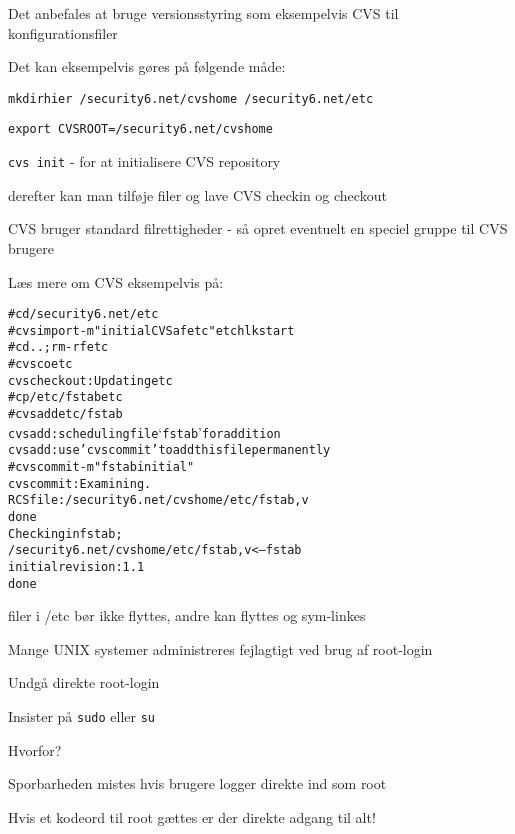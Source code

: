 
\begin{list1}
\item Det anbefales at bruge versionsstyring som eksempelvis CVS til
  konfigurationsfiler 
\item Det kan eksempelvis gøres på følgende måde:
\begin{list2}
\item \verb+mkdirhier /security6.net/cvshome /security6.net/etc+
\item \verb+export CVSROOT=/security6.net/cvshome+
\item \verb+cvs init+ - for at initialisere CVS repository
\item derefter kan man tilføje filer og lave CVS checkin og checkout
\item CVS bruger standard filrettigheder - så opret eventuelt en
  speciel gruppe til CVS brugere
\end{list2}
\item Læs mere om CVS eksempelvis på:\\
\end{list1}

\begin{alltt}
\small
# cd /security6.net/etc
# cvs import -m "initial CVS af etc" etc hlk start
# cd ..;rm -rf etc
# cvs co etc
cvs checkout: Updating etc
# cp /etc/fstab etc
# cvs add etc/fstab 
cvs add: scheduling file `fstab' for addition
cvs add: use 'cvs commit' to add this file permanently
# cvs commit -m "fstab initial"
cvs commit: Examining .
RCS file: /security6.net/cvshome/etc/fstab,v
done
Checking in fstab;
/security6.net/cvshome/etc/fstab,v  <--  fstab
initial revision: 1.1
done
\end{alltt}

\centerline{filer i /etc bør ikke flyttes, andre kan flyttes og sym-linkes}



\begin{list1}
\item Mange UNIX systemer administreres fejlagtigt ved brug af
  root-login
\item Undgå direkte root-login
\item Insister på \verb+sudo+ eller \verb+su+  
\item Hvorfor?
\begin{list2}
\item Sporbarheden mistes hvis brugere logger direkte ind som root
\item Hvis et kodeord til root gættes er der direkte adgang til alt!    
\end{list2}
\end{list1}

